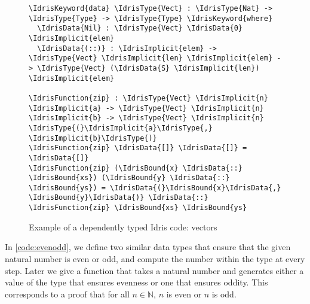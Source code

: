 \begin{figure}[ht]
\caption{Example of a dependently typed Idris code: vectors}
\label{code:vect}
\begin{Verbatim}[framesep=2mm, label=\footnotesize{\normalfont{Idris}}, labelposition=topline]
\IdrisKeyword{data} \IdrisType{Vect} : \IdrisType{Nat} -> \IdrisType{Type} -> \IdrisType{Type} \IdrisKeyword{where}
  \IdrisData{Nil} : \IdrisType{Vect} \IdrisData{0} \IdrisImplicit{elem}
  \IdrisData{(::)} : \IdrisImplicit{elem} -> \IdrisType{Vect} \IdrisImplicit{len} \IdrisImplicit{elem} -> \IdrisType{Vect} (\IdrisData{S} \IdrisImplicit{len}) \IdrisImplicit{elem}

\IdrisFunction{zip} : \IdrisType{Vect} \IdrisImplicit{n} \IdrisImplicit{a} -> \IdrisType{Vect} \IdrisImplicit{n} \IdrisImplicit{b} -> \IdrisType{Vect} \IdrisImplicit{n} \IdrisType{(}\IdrisImplicit{a}\IdrisType{,} \IdrisImplicit{b}\IdrisType{)}
\IdrisFunction{zip} \IdrisData{[]} \IdrisData{[]} = \IdrisData{[]}
\IdrisFunction{zip} (\IdrisBound{x} \IdrisData{::} \IdrisBound{xs}) (\IdrisBound{y} \IdrisData{::} \IdrisBound{ys}) = \IdrisData{(}\IdrisBound{x}\IdrisData{,} \IdrisBound{y}\IdrisData{)} \IdrisData{::} \IdrisFunction{zip} \IdrisBound{xs} \IdrisBound{ys}
\end{Verbatim}
\end{figure}

In \autoref{code:evenodd}, we define
two similar data types that ensure that the given natural number is even or
odd, and compute the number within the type at every step. Later we give a
function that takes a natural number and generates either a value of the type
that ensures evenness or one that ensures oddity. This corresponds to a proof that for all $n \in \mathbb{N}$, $n$ is even or $n$ is odd.

